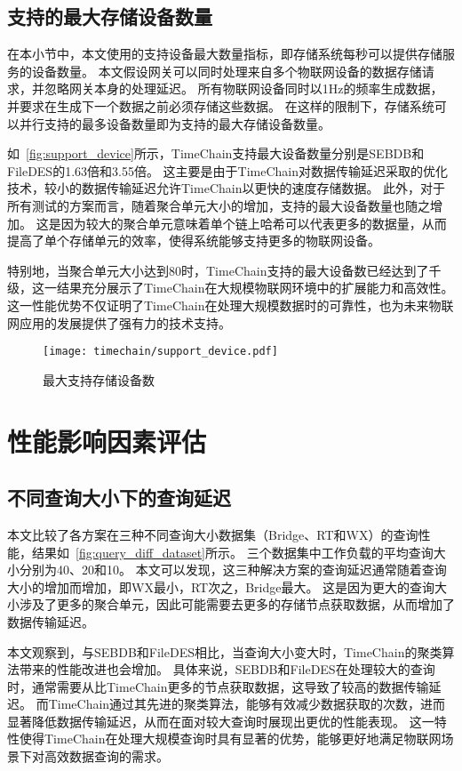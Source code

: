 \subsection{支持的最大存储设备数量}
在本小节中，本文使用的支持设备最大数量指标，即存储系统每秒可以提供存储服务的设备数量。
本文假设网关可以同时处理来自多个物联网设备的数据存储请求，并忽略网关本身的处理延迟。
所有物联网设备同时以1Hz的频率生成数据，并要求在生成下一个数据之前必须存储这些数据。
在这样的限制下，存储系统可以并行支持的最多设备数量即为支持的最大存储设备数量。

如~\autoref{fig:support_device}所示，TimeChain支持最大设备数量分别是SEBDB和FileDES的1.63倍和3.55倍。
这主要是由于TimeChain对数据传输延迟采取的优化技术，较小的数据传输延迟允许TimeChain以更快的速度存储数据。
此外，对于所有测试的方案而言，随着聚合单元大小的增加，支持的最大设备数量也随之增加。
这是因为较大的聚合单元意味着单个链上哈希可以代表更多的数据量，从而提高了单个存储单元的效率，使得系统能够支持更多的物联网设备。

特别地，当聚合单元大小达到80时，TimeChain支持的最大设备数已经达到了千级，这一结果充分展示了TimeChain在大规模物联网环境中的扩展能力和高效性。
这一性能优势不仅证明了TimeChain在处理大规模数据时的可靠性，也为未来物联网应用的发展提供了强有力的技术支持。
\begin{figure}[t]
    \centering
    \texttt{[image: timechain/support\_device.pdf]}
    \caption{最大支持存储设备数}
    \label{fig:support_device}
\end{figure}

\section{性能影响因素评估}
\subsection{不同查询大小下的查询延迟}
本文比较了各方案在三种不同查询大小数据集（Bridge、RT和WX）的查询性能，结果如~\autoref{fig:query_diff_dataset}所示。
三个数据集中工作负载的平均查询大小分别为40、20和10。
本文可以发现，这三种解决方案的查询延迟通常随着查询大小的增加而增加，即WX最小，RT次之，Bridge最大。
这是因为更大的查询大小涉及了更多的聚合单元，因此可能需要去更多的存储节点获取数据，从而增加了数据传输延迟。

本文观察到，与SEBDB和FileDES相比，当查询大小变大时，TimeChain的聚类算法带来的性能改进也会增加。
具体来说，SEBDB和FileDES在处理较大的查询时，通常需要从比TimeChain更多的节点获取数据，这导致了较高的数据传输延迟。
而TimeChain通过其先进的聚类算法，能够有效减少数据获取的次数，进而显著降低数据传输延迟，从而在面对较大查询时展现出更优的性能表现。
这一特性使得TimeChain在处理大规模查询时具有显著的优势，能够更好地满足物联网场景下对高效数据查询的需求。

